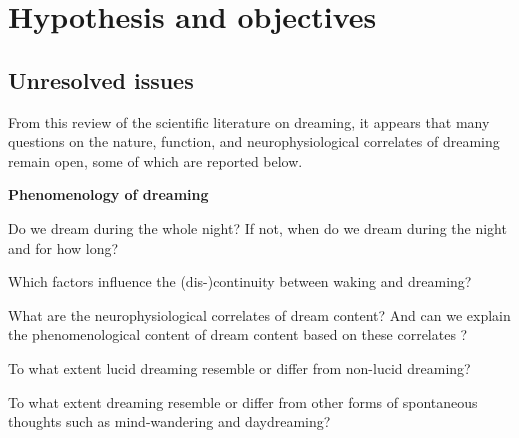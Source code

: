 \cleardoublepage

\chapter{Hypothesis and objectives}
\label{sec:problematic}


\section{Unresolved issues}
\label{sec:problematic:unresolved}

From this review of the scientific literature on dreaming, it appears that many questions on the nature, function, and neurophysiological correlates of dreaming remain open, some of which are reported below.

\textbf{Phenomenology of dreaming}
\begin{my_list_item}
    \item Do we dream during the whole night? If not, when do we dream during the night and for how long?
	\item Which factors influence the (dis-)continuity between waking and dreaming?
	\item What are the neurophysiological correlates of dream content? And can we explain the phenomenological content of dream content based on these correlates ?
	\item To what extent lucid dreaming resemble or differ from non-lucid dreaming?
	\item To what extent dreaming resemble or differ from other forms of spontaneous thoughts such as mind-wandering and daydreaming?
\end{my_list_item}

